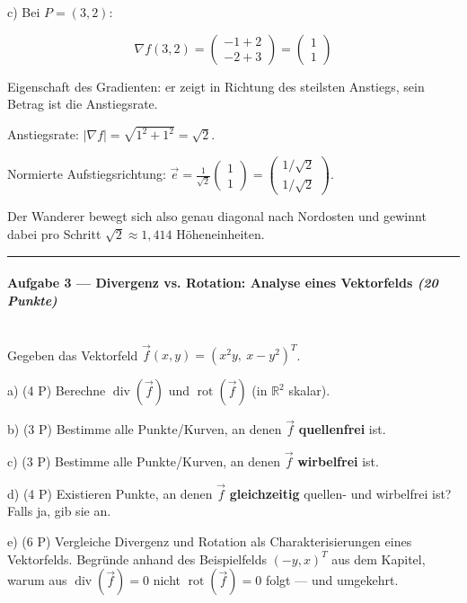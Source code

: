 \documentclass[11pt, a4paper]{article}
\begin{document}
c) Bei $P=(3,2)$:

\[
\nabla f(3,2) = \begin{pmatrix} -1+2 \\ -2+3 \end{pmatrix} = \begin{pmatrix} 1 \\ 1 \end{pmatrix}
\]

Eigenschaft des Gradienten: er zeigt in Richtung des steilsten Anstiegs, sein Betrag ist die Anstiegsrate.


Anstiegsrate: $|\nabla f| = \sqrt{1^2 + 1^2} = \sqrt{2}$.


Normierte Aufstiegsrichtung: $\vec{e} = \frac{1}{\sqrt{2}}\begin{pmatrix}1\\1\end{pmatrix} = \begin{pmatrix}1/\sqrt{2}\\1/\sqrt{2}\end{pmatrix}$.


Der Wanderer bewegt sich also genau diagonal nach Nordosten und gewinnt dabei pro Schritt $\sqrt{2} \approx 1{,}414$ Höheneinheiten.



\noindent\textcolor{rulegray}{\rule{\linewidth}{0.4pt}}


\paragraph{Aufgabe 3 — Divergenz vs. Rotation: Analyse eines Vektorfelds \textit{(20 Punkte)}}\mbox{}\\[2pt]

Gegeben das Vektorfeld $\vec{f}(x,y) = (x^2y,\ x - y^2)^T$.


a) (4 P) Berechne $\operatorname{div}(\vec{f})$ und $\operatorname{rot}(\vec{f})$ (in $\mathbb{R}^2$ skalar).


b) (3 P) Bestimme alle Punkte/Kurven, an denen $\vec{f}$ \textbf{quellenfrei} ist.


c) (3 P) Bestimme alle Punkte/Kurven, an denen $\vec{f}$ \textbf{wirbelfrei} ist.


d) (4 P) Existieren Punkte, an denen $\vec{f}$ \textbf{gleichzeitig} quellen- und wirbelfrei ist? Falls ja, gib sie an.


e) (6 P) Vergleiche Divergenz und Rotation als Charakterisierungen eines Vektorfelds. Begründe anhand des Beispielfelds $(-y, x)^T$ aus dem Kapitel, warum aus $\operatorname{div}(\vec{f})=0$ nicht $\operatorname{rot}(\vec{f})=0$ folgt — und umgekehrt.
\end{document}

